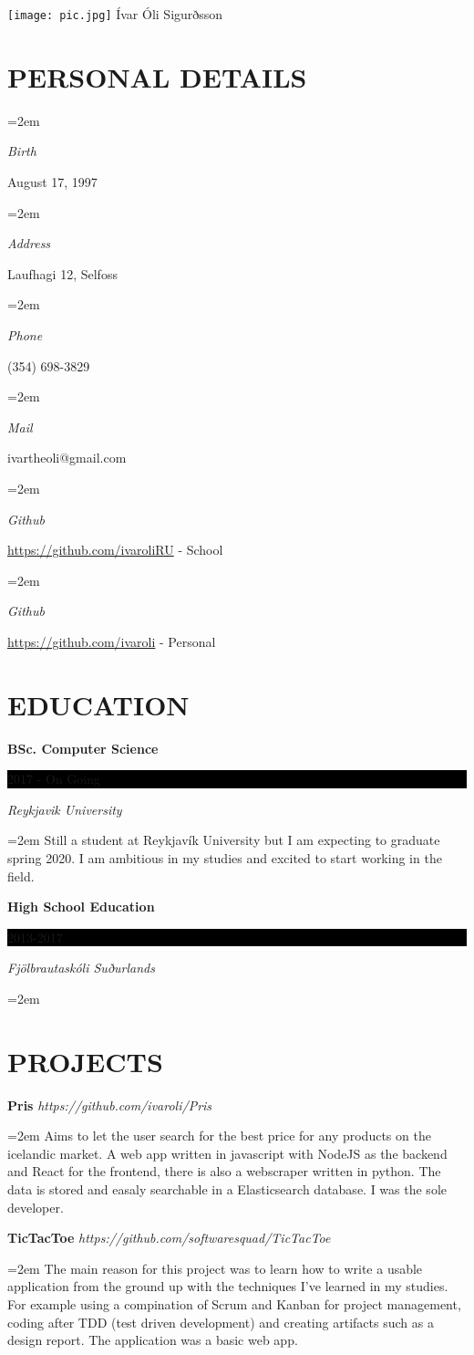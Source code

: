 \documentclass[paper=a4,fontsize=11pt]{scrartcl} %
\newlength{\spacebox}
\newcommand{\sepspace}{\vspace*{1em}}		%
\newcommand{\MyName}[1]{ %
        \texttt{[image: pic.jpg]}
		\Huge \usefont{T1}{phv}{b}{n} \hfill #1
		\par \normalsize \normalfont}
\newcommand{\MySlogan}[1]{ %
		\large \usefont{OT1}{phv}{m}{n}\hfill \textit{#1}
		\par \normalsize \normalfont}
\newcommand{\NewPart}[1]{\section*{\uppercase{#1}}}
\newcommand{\PersonalEntry}[2]{
		\noindent\hangindent=2em\hangafter=0 %
		\parbox{\spacebox}{        %
		\textit{#1}}		       %
		\hspace{1.5em} #2 \par}    %
\newcommand{\EducationEntry}[4]{
		\noindent \textbf{#1} \hfill      %
		\colorbox{Black}{%
			\parbox{6em}{%
			\hfill\color{White}#2}} \par  %
		\noindent \textit{#3} \par        %
		\noindent\hangindent=2em\hangafter=0 \small #4 %
		\normalsize \par}
\newcommand{\ProjectEntry}[3]{
		\noindent \textbf{#1} \hfill\newline      %
		\noindent \textit{#2} \par        %
		\noindent\hangindent=2em\hangafter=0 \small #3 %
		\normalsize \par}
\begin{document}

\MyName{Ívar Óli Sigurðsson}

\sepspace

\NewPart{Personal details}{}

\PersonalEntry{Birth}{August 17, 1997}
\PersonalEntry{Address}{Laufhagi 12, Selfoss}
\PersonalEntry{Phone}{(354) 698-3829}
\PersonalEntry{Mail}{ivartheoli@gmail.com}
\PersonalEntry{Github}{\href{https://github.com/ivaroliRU}{https://github.com/ivaroliRU} - School}
\PersonalEntry{Github}{\href{https://github.com/ivaroli}{https://github.com/ivaroli} - Personal}

\NewPart{Education}{}

\EducationEntry{BSc. Computer Science}{2017 - On Going}{Reykjavik University}{Still a student at Reykjavík University but I am expecting to graduate spring 2020. I am ambitious in my studies and excited to start working in the field.}
\sepspace
\EducationEntry{High School Education}{2013-2017}{Fjölbrautaskóli Suðurlands}{}
\sepspace

\NewPart{Projects}{}

\ProjectEntry{Pris}{https://github.com/ivaroli/Pris}{Aims to let the user search for the best price for any products on the icelandic market. A web app written in javascript with NodeJS as the backend and React for the frontend, there is also a webscraper written in python. The data is stored and easaly searchable in a Elasticsearch database. I was the sole developer.}

\ProjectEntry{TicTacToe}{https://github.com/softwaresquad/TicTacToe}{The main reason for this project was to learn how to write a usable application from the ground up with the techniques I've learned in my studies. For example using a compination of Scrum and Kanban for project management, coding after TDD (test driven development) and creating artifacts such as a design report. The application was a basic web app.}

\clearpage
\end{document}
